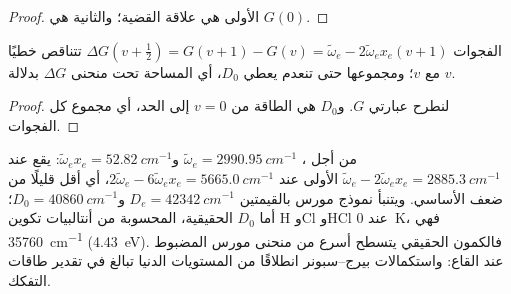 \begin{proof}
الأولى هي علاقة القضية؛ والثانية هي $G(0)$.
\end{proof}

\begin{proposition}\label{prop:b3:rovibrational-spectroscopy:birge-sponer}
الفجوات $\Delta G(v + \frac12) = G(v+1) - G(v) = \tilde\omega_e - 2\tilde\omega_ex_e(v +
1)$ تتناقص خطيًا مع $v$؛ ومجموعها حتى تنعدم يعطي $D_0$، أي
المساحة تحت منحنى $\Delta G$ بدلالة $v$.
\end{proposition}

\begin{proof}
لنطرح عبارتي $G$. و$D_0$ هي الطاقة من $v = 0$ إلى
الحد، أي مجموع كل الفجوات.
\end{proof}

\begin{example}\label{ex:b3:rovibrational-spectroscopy:hcl}
من أجل ، $\tilde\omega_e = \qty{2990.95}{cm^{-1}}$ و$\tilde\omega_ex_e =
\qty{52.82}{cm^{-1}}$: يقع  عند $\tilde\omega_e - 2\tilde\omega_ex_e =
\qty{2885.3}{cm^{-1}}$  الأولى عند $2\tilde\omega_e - 6\tilde\omega_ex_e =
\qty{5665.0}{cm^{-1}}$، أي أقل قليلًا من ضعف الأساسي. ويتنبأ نموذج مورس
بالقيمتين $D_e = \qty{42342}{cm^{-1}}$ و$D_0 = \qty{40860}{cm^{-1}}$؛ أما $D_0$ الحقيقية،
المحسوبة من أنتالبيات تكوين H وCl وHCl عند \qty{0}{K}، فهي
\qty{35760}{cm^{-1}} (\qty{4.43}{eV}). فالكمون الحقيقي يتسطح أسرع من
منحنى مورس المضبوط عند القاع: واستكمالات بيرج--سبونر انطلاقًا من
المستويات الدنيا تبالغ في تقدير طاقات التفكك.
\end{example}

